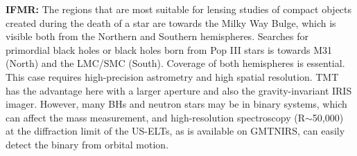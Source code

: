 \documentclass[11pt]{article}
\begin{document}
		
{\bf IFMR:} The regions that are most suitable for lensing studies of compact objects created during the death of a star are towards the Milky Way Bulge, which is visible both from the Northern and Southern hemispheres. 
Searches for primordial black holes or black holes born from Pop III stars is towards M31 (North) and the LMC/SMC (South). Coverage of both hemispheres is essential. This case requires high-precision astrometry and high spatial resolution. TMT has the advantage here with a larger aperture and also the gravity-invariant IRIS imager. However, many BHs and neutron stars may be in binary systems, which can affect the mass measurement, and high-resolution spectroscopy (R$\sim$50,000) at the diffraction limit of the US-ELTs, as is available on GMTNIRS, can easily detect the binary from orbital motion. 

%
\expdesign
\end{document}
